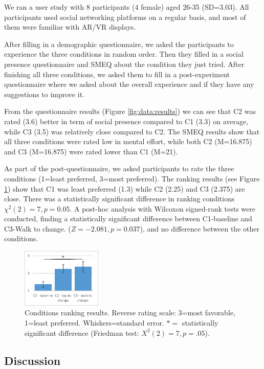 We ran a user study with 8 participants (4 female) aged 26-35 (SD=3.03). All participants used social networking platforms on a regular basis, and most of them were familiar with AR/VR displays. 

After filling in a demographic questionnaire, we asked the participants to experience the three conditions in random order. Then they filled in a social presence questionnaire and SMEQ about the condition they just tried. After finishing all three conditions, we asked them to fill in a post-experiment questionnaire where we asked about the overall experience and if they have any suggestions to improve it. 

From the questionnaire results (Figure \ref{fig:data:results}) we can see that C2 was rated (3.6) better in term of social presence compared to C1 (3.3) on average, while C3 (3.5) was relatively close compared to C2. The SMEQ results show that all three conditions were rated low in mental effort, while both C2 (M=16.875) and C3 (M=16.875) were rated lower than C1 (M=21).

As part of the post-questionnaire, we asked participants to rate the three conditions (1=least preferred, 3=most preferred). The ranking results (see Figure \ref{fig:data:ranking}) show that C1 was least preferred (1.3) while C2 (2.25) and C3 (2.375) are close. There was a statistically significant difference in ranking conditions $\chi^2(2)=7, p=0.05$. A post-hoc analysis with Wilcoxon signed-rank tests were conducted, finding a statistically significant difference between C1-baseline and C3-Walk to change. ($Z=-2.081, p=0.037$), and no difference between the other conditions.

\begin{figure}[h]
  \centering
  \includegraphics[width=1.5in]{images/chi/images-05.eps}
  \caption{Conditions ranking results. Reverse rating scale: 3=most favorable, 1=least preferred. Whiskers=standard error. $*=$ statistically significant difference (Friedman test: $X^2(2)=7, p=.05$).}  
      \label{fig:data:ranking}
\end{figure}

\subsection{Discussion}

